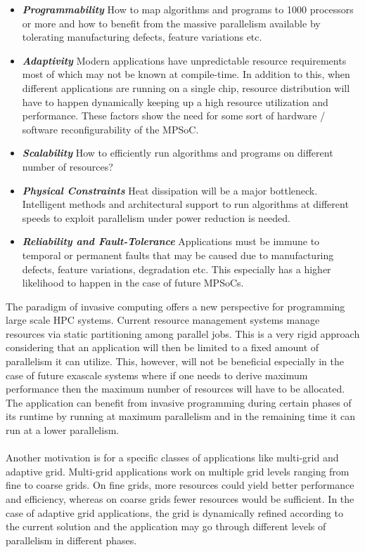\begin{itemize}
\item \textbf{\textit{Programmability}} How to map algorithms and programs to 1000 processors or more and how to benefit from the massive parallelism available by tolerating manufacturing defects, feature variations etc.
\item \textbf{\textit{Adaptivity}} Modern applications have unpredictable resource requirements most of which may not be known at compile-time. In addition to this, when different applications are running on a single chip, resource distribution will have to happen dynamically keeping up a high resource utilization and performance. These factors show the need for some sort of hardware / software reconfigurability of the MPSoC.
\item \textbf{\textit{Scalability}} How to efficiently run algorithms and programs on different number of resources?
\item \textbf{\textit{Physical Constraints}} Heat dissipation will be a major bottleneck. Intelligent methods and architectural support to run algorithms at different speeds to exploit parallelism under power reduction is needed.
\item \textbf{\textit{Reliability and Fault-Tolerance}} Applications must be immune to temporal or permanent faults that may be caused due to manufacturing defects, feature variations, degradation etc. This especially has a higher likelihood to happen in the case of future MPSoCs.
\end{itemize}
The paradigm of invasive computing offers a new perspective for programming large scale HPC systems. Current resource management systems manage resources via static partitioning among parallel jobs. This is a very rigid approach considering that an application will then be limited to a fixed amount of parallelism it can utilize. This, however, will not be beneficial especially in the case of future exascale systems where if one needs to derive maximum performance then the maximum number of resources will have to be allocated. The application can benefit from invasive programming during certain phases of its runtime by running at maximum parallelism and in the remaining time it can run at a lower parallelism.\\ \\
Another motivation is for a specific classes of applications like multi-grid and adaptive grid. Multi-grid applications work on multiple grid levels ranging from fine to coarse grids. On fine grids, more resources could yield better performance and efficiency, whereas on coarse grids fewer resources would be sufficient. In the case of adaptive grid applications, the grid is dynamically refined according to the current solution and the application may go through different levels of parallelism in different phases.\\ \\
